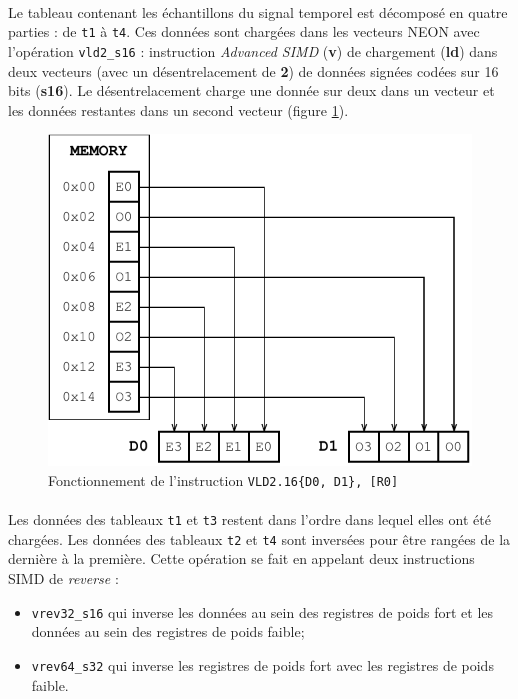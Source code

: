\documentclass{article}
\begin{document}
    \paragraph{}
    Le tableau contenant les échantillons du signal temporel est décomposé en quatre parties : de \texttt{t1} à \texttt{t4}. Ces données sont chargées dans les vecteurs NEON avec l'opération \texttt{vld2\_s16} : instruction \emph{Advanced SIMD} (\textbf{v}) de chargement (\textbf{ld}) dans deux vecteurs (avec un désentrelacement de \textbf{2}) de données signées codées sur 16 bits (\textbf{s16}). Le désentrelacement charge une donnée sur deux dans un vecteur et les données restantes dans un second vecteur (figure \ref{fig:vld2_s16})\cite{tuto-neon}.
    \begin{figure}[H]
        \centering
        \includegraphics[width=.6\linewidth]{./images/vld2_s16.pdf}
        \caption{Fonctionnement de l'instruction \texttt{VLD2.16\{D0, D1\}, [R0]}}
        \label{fig:vld2_s16}
    \end{figure}

    \paragraph{}
    Les données des tableaux \texttt{t1} et \texttt{t3} restent dans l'ordre dans lequel elles ont été chargées. Les données des tableaux \texttt{t2} et \texttt{t4} sont inversées pour être rangées de la dernière à la première. Cette opération se fait en appelant deux instructions SIMD de \emph{reverse} :
    \begin{itemize}
        \item \texttt{vrev32\_s16} qui inverse les données au sein des registres de poids fort et les données au sein des registres de poids faible;
        \item \texttt{vrev64\_s32} qui inverse les registres de poids fort avec les registres de poids faible.
    \end{itemize}
\end{document}
